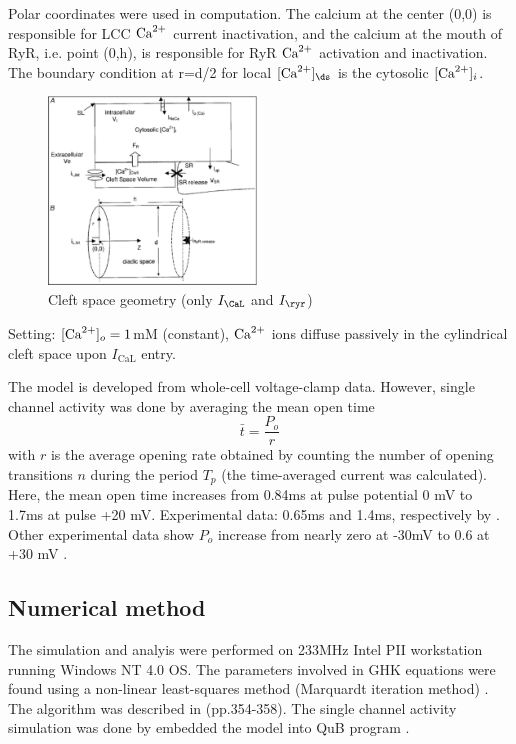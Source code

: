 Polar coordinates were used in computation. The calcium at the center (0,0) is
responsible for LCC ${\text{Ca}^{2+}}$ current inactivation, and the calcium at the mouth of
RyR, i.e. point (0,h), is responsible for RyR ${\text{Ca}^{2+}}$ activation and inactivation.
The boundary condition at r=d/2 for local $[\Ca]_\ds$ is the cytosolic
$[{\text{Ca}^{2+}}]_i$.

\begin{figure}[hbt]
 \centerline{\includegraphics[height=5cm, angle=0]{./images/Sun_cleftspace.eps}}
\caption{Cleft space geometry (only $I_\CaL$ and $I_\ryr$)}
\label{fig:Sun_DHPR_cellmodel}
\end{figure}

Setting: $[{\text{Ca}^{2+}}]_o = 1$mM (constant), ${\text{Ca}^{2+}}$ ions diffuse passively in the
cylindrical cleft space upon $I_\text{CaL}$ entry.

The model is developed from whole-cell voltage-clamp data. However, single
channel activity was done by averaging the mean open time
\begin{equation}
\bar{t} = \frac{P_o}{r}
\end{equation}
with $r$ is the average opening rate obtained by counting the number of opening
transitions $n$ during the period $T_p$ (the time-averaged current was
calculated). Here, the mean open time increases from 0.84ms at pulse potential
0 mV to 1.7ms at pulse +20 mV. Experimental data: 0.65ms and 1.4ms, respectively
by \citep{fenwick1982}. Other experimental data show $P_o$ increase from nearly
zero at -30mV to 0.6 at +30 mV \citep{reuter1982}.
 
\subsection{Numerical method}

The simulation and analyis were performed on 233MHz Intel PII workstation
running Windows NT 4.0 OS. The parameters involved in GHK equations were found
using a non-linear least-squares method (Marquardt iteration method)
\citep{marquardt1963}. The algorithm was described in \citep{lau1995}
(pp.354-358). The single channel activity simulation was done by embedded the
model into QuB program \citep{qin1996}. 

